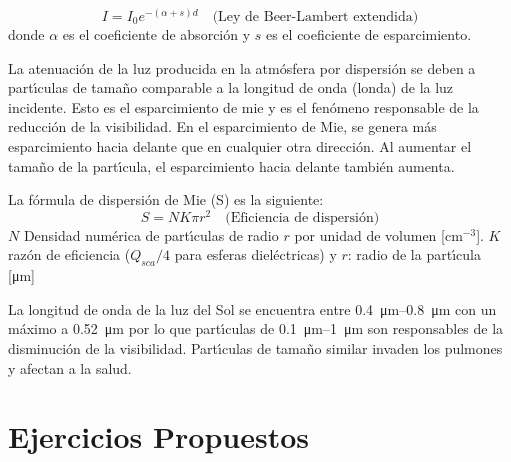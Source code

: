 \begin{equation}
I = I_0 e^{-(\alpha + s)d} \quad \text{(Ley de Beer-Lambert extendida)}
\end{equation}
donde $\alpha$ es el coeficiente de absorci\'on y $s$ es el coeficiente de esparcimiento.

La atenuaci\'on de la luz producida en la atm\'osfera por dispersi\'on se deben a part\'{\i}culas de tama\~no comparable a la longitud de onda (\gls{londa}) de la luz incidente. Esto es el esparcimiento de \gls{mie} y es el fen\'omeno responsable de la reducci\'on de la visibilidad. En el esparcimiento de Mie, se genera m\'as esparcimiento hacia delante que en cualquier otra direcci\'on. Al aumentar el tama\~no de la part\'{\i}cula, el esparcimiento hacia delante tambi\'en aumenta.


La f\'ormula de dispersi\'on de Mie (S) es la siguiente:
\begin{equation}
S = NK\pi r^2 \quad \text{(Eficiencia de dispersi\'on)}
\end{equation}
$N$ Densidad num\'erica  de part\'{\i}culas de radio $r$ por unidad de volumen [cm$^{-3}$]. $K$ raz\'on de eficiencia (${Q_{sca}}/{4}$ para esferas diel\'ectricas) y
$r$: radio de la part\'{\i}cula [\si{\micro\metre}]

La longitud de onda de la luz del Sol se encuentra entre  \SIrange{0.4}{0.8}{\micro\metre}  con un m\'aximo a \SI{0.52}{\micro\metre} por lo que part\'{\i}culas de \SIrange{0.1}{1}{\micro\metre} son responsables de la disminuci\'on de la visibilidad. Part\'{\i}culas de tama\~no similar invaden los pulmones y afectan a la salud.

\section*{Ejercicios Propuestos}
\label{sec:ejercicios_cap07}

